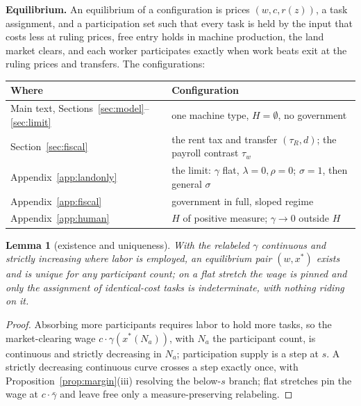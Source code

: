\documentclass[12pt]{article}
\theoremstyle{plain}
\newtheorem{lemma}[proposition]{Lemma}
\begin{document}
\textbf{Equilibrium.} An equilibrium of a configuration is prices $(w,c,r(z))$, a task assignment, and a participation set such that every task is held by the input that costs less at ruling prices, free entry holds in machine production, the land market clears, and each worker participates exactly when work beats exit at the ruling prices and transfers. The configurations:

\begin{center}
{\small
\begin{tabular}{l p{8.6cm}}
\toprule
Where & Configuration \\
\midrule
Main text, Sections~\ref{sec:model}--\ref{sec:limit} & one machine type, $H = \emptyset$, no government \\
Section~\ref{sec:fiscal} & the rent tax and transfer $(\tau _R,d)$; the payroll contrast $\tau _w$ \\
Appendix~\ref{app:landonly} & the limit: $\gamma$ flat, $\lambda = 0, \rho = 0$; $\sigma = 1$, then general $\sigma$ \\
Appendix~\ref{app:fiscal} & government in full, sloped regime \\
Appendix~\ref{app:human} & $H$ of positive measure; $\gamma \to 0$ outside $H$ \\
\bottomrule
\end{tabular}
}
\end{center}

\begin{lemma}[existence and uniqueness]\label{lem:existence}
With the relabeled $\gamma$ continuous and strictly increasing where labor is employed, an equilibrium pair $(w, x^*)$ exists and is unique for any participant count; on a flat stretch the wage is pinned and only the assignment of identical-cost tasks is indeterminate, with nothing riding on it.
\end{lemma}

\begin{proof}
Absorbing more participants requires labor to hold more tasks, so the market-clearing wage $c\cdot \gamma (x^*(N_a))$, with $N_a$ the participant count, is continuous and strictly decreasing in $N_a$; participation supply is a step at $s$. A strictly decreasing continuous curve crosses a step exactly once, with Proposition~\ref{prop:margin}(iii) resolving the below-$s$ branch; flat stretches pin the wage at $c\cdot \bar{\gamma}$ and leave free only a measure-preserving relabeling.
\end{proof}
\end{document}
